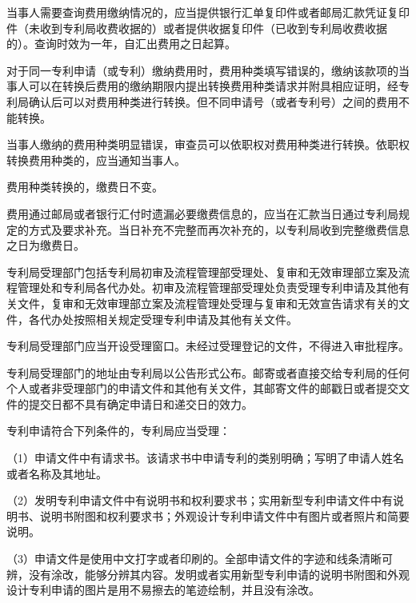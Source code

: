当事人需要查询费用缴纳情况的，应当提供银行汇单复印件或者邮局汇款凭证复印件（未收到专利局收费收据的）或者提供收据复印件（已收到专利局收费收据的）。查询时效为一年，自汇出费用之日起算。

对于同一专利申请（或专利）缴纳费用时，费用种类填写错误的，缴纳该款项的当事人可以在转换后费用的缴纳期限内提出转换费用种类请求并附具相应证明，经专利局确认后可以对费用种类进行转换。但不同申请号（或者专利号）之间的费用不能转换。

当事人缴纳的费用种类明显错误，审查员可以依职权对费用种类进行转换。依职权转换费用种类的，应当通知当事人。

费用种类转换的，缴费日不变。

费用通过邮局或者银行汇付时遗漏必要缴费信息的，应当在汇款当日通过专利局规定的方式及要求补充。当日补充不完整而再次补充的，以专利局收到完整缴费信息之日为缴费日。

专利局受理部门包括专利局初审及流程管理部受理处、复审和无效审理部立案及流程管理处和专利局各代办处。初审及流程管理部受理处负责受理专利申请及其他有关文件，复审和无效审理部立案及流程管理处受理与复审和无效宣告请求有关的文件，各代办处按照相关规定受理专利申请及其他有关文件。

专利局受理部门应当开设受理窗口。未经过受理登记的文件，不得进入审批程序。

专利局受理部门的地址由专利局以公告形式公布。邮寄或者直接交给专利局的任何个人或者非受理部门的申请文件和其他有关文件，其邮寄文件的邮戳日或者提交文件的提交日都不具有确定申请日和递交日的效力。

专利申请符合下列条件的，专利局应当受理：

{\setlength{\parindent}{17.1bp}（1）申请文件中有请求书。该请求书中申请专利的类别明确；写明了申请人姓名或者名称及其地址。\par}

{\setlength{\parindent}{17.1bp}（2）发明专利申请文件中有说明书和权利要求书；实用新型专利申请文件中有说明书、说明书附图和权利要求书；外观设计专利申请文件中有图片或者照片和简要说明。\par}

{\setlength{\parindent}{17.1bp}（3）申请文件是使用中文打字或者印刷的。全部申请文件的字迹和线条清晰可辨，没有涂改，能够分辨其内容。发明或者实用新型专利申请的说明书附图和外观设计专利申请的图片是用不易擦去的笔迹绘制，并且没有涂改。\par}

